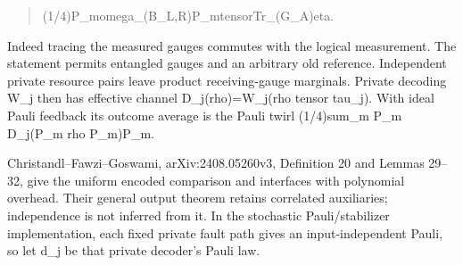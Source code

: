 \documentclass[
]{article}
\begin{document}
\begin{quote}\small\ttfamily\raggedright\setlength{\parskip}{0pt}
\noindent (\allowbreak{}1\allowbreak{}/\allowbreak{}4\allowbreak{})\allowbreak{}\hspace*{0.525em}\allowbreak{}P\allowbreak{}\_\allowbreak{}m\allowbreak{}\hspace*{0.525em}\allowbreak{}o\allowbreak{}m\allowbreak{}e\allowbreak{}g\allowbreak{}a\allowbreak{}\_\allowbreak{}(\allowbreak{}B\allowbreak{}\_\allowbreak{}L\allowbreak{},\allowbreak{}R\allowbreak{})\allowbreak{}\hspace*{0.525em}\allowbreak{}P\allowbreak{}\_\allowbreak{}m\allowbreak{}\hspace*{0.525em}\allowbreak{}t\allowbreak{}e\allowbreak{}n\allowbreak{}s\allowbreak{}o\allowbreak{}r\allowbreak{}\hspace*{0.525em}\allowbreak{}T\allowbreak{}r\allowbreak{}\_\allowbreak{}(\allowbreak{}G\allowbreak{}\_\allowbreak{}A\allowbreak{})\allowbreak{}e\allowbreak{}t\allowbreak{}a\allowbreak{}.\par
\end{quote}

Indeed tracing the measured gauges commutes with the logical
measurement. The statement permits entangled gauges and an arbitrary old
reference. Independent private resource pairs leave product
receiving-gauge marginals. Private decoding W\_j then has effective
channel
D\allowbreak{}\_\allowbreak{}j\allowbreak{}(\allowbreak{}r\allowbreak{}h\allowbreak{}o\allowbreak{})\allowbreak{}=\allowbreak{}W\allowbreak{}\_\allowbreak{}j\allowbreak{}(\allowbreak{}r\allowbreak{}h\allowbreak{}o
tensor tau\_j). With ideal Pauli feedback its outcome average is the
Pauli twirl (1/4)sum\_m P\_m D\_j(P\_m rho P\_m)P\_m.

Christandl--Fawzi--Goswami, arXiv:2408.05260v3, Definition 20 and Lemmas
29--32, give the uniform encoded comparison and interfaces with
polynomial overhead. Their general output theorem retains correlated
auxiliaries; independence is not inferred from it. In the stochastic
P\allowbreak{}a\allowbreak{}u\allowbreak{}l\allowbreak{}i\allowbreak{}/\allowbreak{}s\allowbreak{}t\allowbreak{}a\allowbreak{}b\allowbreak{}i\allowbreak{}l\allowbreak{}i\allowbreak{}z\allowbreak{}e\allowbreak{}r
implementation, each fixed private fault path gives an input-independent
Pauli, so let d\_j be that private decoder's Pauli law.
\end{document}
